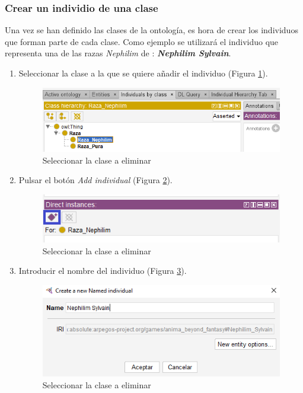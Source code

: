 \subsubsection{Crear un individio de una clase}
Una vez se han definido las clases de la ontología, es hora de crear los individuos que forman parte de cada clase.
Como ejemplo se utilizará el individuo que representa una de las razas \textit{Nephilim} de \anima: \textit{\textbf{Nephilim Sylvain}}.

\begin{enumerate}
    \item Seleccionar la clase a la que se quiere añadir el individuo (Figura \ref*{CreateIndividual_1}).
    \begin{figure}[H]
        \centering
        \includegraphics[scale=0.6]{Figures/Protege/CreateIndividual_1.png}
        \caption{Seleccionar la clase a eliminar}
        \label{CreateIndividual_1}
    \end{figure}

    \item Pulsar el botón \textit{Add individual} (Figura \ref*{CreateIndividual_2}).
    \begin{figure}[H]
        \centering
        \includegraphics[scale=0.6]{Figures/Protege/CreateIndividual_2.png}
        \caption{Seleccionar la clase a eliminar}
        \label{CreateIndividual_2}
    \end{figure}

    \item Introducir el nombre del individuo (Figura \ref*{CreateIndividual_3}).
    \begin{figure}[H]
        \centering
        \includegraphics[scale=0.6]{Figures/Protege/CreateIndividual_3.png}
        \caption{Seleccionar la clase a eliminar}
        \label{CreateIndividual_3}
    \end{figure}


\end{enumerate}
